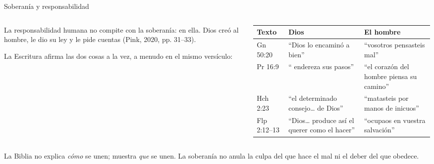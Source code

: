 \begin{frame}{Soberanía y responsabilidad}
\begin{columns}[t,onlytextwidth]
\begin{column}{0.48\textwidth}\small
La responsabilidad humana no compite con la soberanía:  en ella. Dios creó al hombre, le dio su ley y le pide cuentas (Pink, 2020, pp. 31--33).\par\medskip
La Escritura afirma las dos cosas a la vez, a menudo en el mismo versículo:
\end{column}
\begin{column}{0.50\textwidth}
\scriptsize\renewcommand{\arraystretch}{1.15}
\begin{tabular}{@{}>{\RaggedRight\arraybackslash}p{1.4cm}>{\RaggedRight\arraybackslash}p{2.3cm}>{\RaggedRight\arraybackslash}p{2.3cm}@{}}
\toprule
\textbf{Texto} & \textbf{Dios} & \textbf{El hombre} \\ \midrule
Gn 50:20 & ``Dios lo encaminó a bien'' & ``vosotros pensasteis mal'' \\
Pr 16:9 & ``\SENOR{} endereza sus pasos'' & ``el corazón del hombre piensa su camino'' \\
Hch 2:23 & ``el determinado consejo\ldots{} de Dios'' & ``matasteis por manos de inicuos'' \\
Flp 2:12--13 & ``Dios\ldots{} produce así el querer como el hacer'' & ``ocupaos en vuestra salvación'' \\
\bottomrule
\end{tabular}
\end{column}
\end{columns}\par\medskip
\begin{tcolorbox}[colback=papiro,colframe=azul,boxrule=1pt,arc=3pt]
\small La Biblia no explica \emph{cómo} se unen; muestra \emph{que} se unen. La soberanía no anula la culpa del que hace el mal ni el deber del que obedece.
\end{tcolorbox}
\end{frame}

